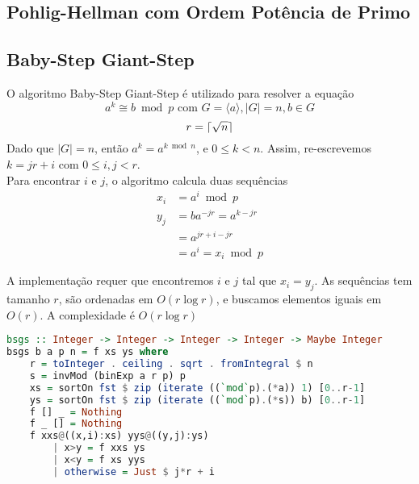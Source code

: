 \documentclass{article}
\DeclarePairedDelimiter{\ceil}{\lceil}{\rceil}
\begin{document}
\subsection{Pohlig-Hellman com Ordem Potência de Primo}

\subsection{Baby-Step Giant-Step}
O algoritmo Baby-Step Giant-Step é utilizado para resolver a equação
$$ a^k \cong b \bmod p \text{ com } G = \langle a \rangle, |G| = n, b \in G$$
$$ r = \ceil{\sqrt{n}}$$
Dado que $ |G| = n $, então $ a^k = a^{k \bmod n} $, e $ 0 \leq k < n $. Assim, re-escrevemos $ k = j r + i $ com $ 0 \leq i, j < r $.\\
Para encontrar $i$ e $j$, o algoritmo calcula duas sequências
\begin{align*}
    x_i &= a^i \bmod p\\
    y_j &= b a^{-j r} = a^{k - j r}\\
        &= a^{j r + i - j r}\\
        &= a^{i} = x_i \bmod p
\end{align*}

A implementação requer que encontremos $i$ e $j$ tal que $x_i = y_j$. As sequências tem tamanho $r$, são ordenadas em $O(r \log r)$, e buscamos elementos iguais em $O(r)$. A complexidade é $O(r \log r)$

\noindent\hspace{0.03\linewidth}
\begin{minipage}{.9\linewidth}
\begin{lstlisting}[language=haskell,caption=Baby-Steps Giant-Steps]
bsgs :: Integer -> Integer -> Integer -> Integer -> Maybe Integer
bsgs b a p n = f xs ys where
    r = toInteger . ceiling . sqrt . fromIntegral $ n
    s = invMod (binExp a r p) p
    xs = sortOn fst $ zip (iterate ((`mod`p).(*a)) 1) [0..r-1]
    ys = sortOn fst $ zip (iterate ((`mod`p).(*s)) b) [0..r-1]
    f [] _ = Nothing
    f _ [] = Nothing
    f xxs@((x,i):xs) yys@((y,j):ys)
        | x>y = f xxs ys
        | x<y = f xs yys
        | otherwise = Just $ j*r + i
\end{lstlisting}
\end{minipage}
\end{document}
